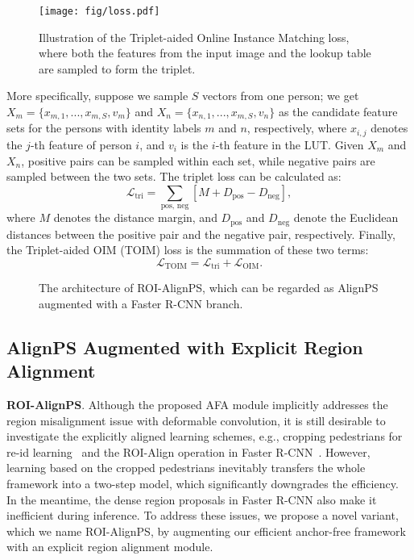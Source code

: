 \documentclass[journal]{IEEEtran}
\begin{document}
\begin{figure}[t]
\centering
\texttt{[image: fig/loss.pdf]}
\caption{Illustration of the Triplet-aided Online Instance Matching loss, where both the features from the input image and the lookup table are sampled to form the triplet.}
\label{fig:loss}
\end{figure}

More specifically, suppose we sample $S$ vectors from one person; we get $X_m = \{x_{m,1},..., x_{m,S}, v_m\}$ and $X_n=\{x_{n,1},..., x_{m,S}, v_n\}$ as the candidate feature sets for the persons with identity labels $m$ and $n$, respectively, where $x_{i,j}$ denotes the $j$-th feature of person $i$, and $v_i$ is the $i$-th feature in the LUT. Given $X_m$ and $X_n$, positive pairs can be sampled within each set, while negative pairs are sampled between the two sets. The triplet loss can be calculated as:
\begin{equation}
    \mathcal{L}_{\text{tri}} = \sum_{\text{pos,~neg}}[M + D_{\text{pos}} - D_{\text{neg}}],
\end{equation}
where $M$ denotes the distance margin, and $D_{\text{pos}}$ and $D_{\text{neg}}$ denote the Euclidean distances between the positive pair and the negative pair, respectively. Finally, the Triplet-aided OIM (TOIM) loss is the summation of these two terms:
\begin{equation}
    \mathcal{L}_{\text{TOIM}} = \mathcal{L}_{\text{tri}}+\mathcal{L}_{\text{OIM}}.
\end{equation}


\begin{figure*}[t]
\centering
{}
\hspace{1mm}
\centering
{}
 \caption{The architecture of ROI-AlignPS, which can be regarded as AlignPS augmented with a Faster R-CNN branch.}
 \label{fig:ralignps}
\end{figure*}

\subsection{AlignPS Augmented with Explicit Region Alignment}\label{sec:mls}
\textbf{ROI-AlignPS}. Although the proposed AFA module implicitly addresses the region misalignment issue with deformable convolution, it is still desirable to investigate the explicitly aligned learning schemes, e.g., cropping pedestrians for re-id learning~\cite{DBLP:conf/cvpr/ZhengZSCYT17,DBLP:conf/eccv/ChenZOYT18} and the ROI-Align operation in Faster R-CNN~\cite{DBLP:conf/cvpr/XiaoLWLW17,DBLP:conf/cvpr/ChenZYS20}. However, learning based on the cropped pedestrians inevitably transfers the whole framework into a two-step model, which significantly downgrades the efficiency. In the meantime, the dense region proposals in Faster R-CNN also make it inefficient during inference. To address these issues, we propose a novel variant, which we name ROI-AlignPS, by augmenting our efficient anchor-free framework with an explicit region alignment module. 
\end{document}
